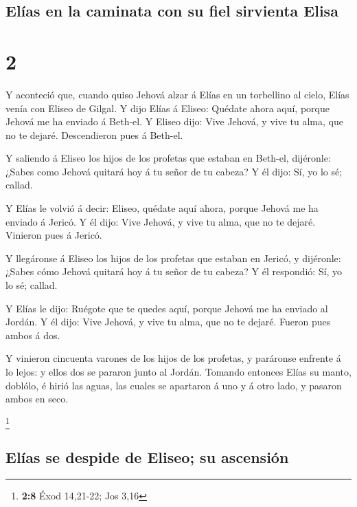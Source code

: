 \hypertarget{eluxedas-en-la-caminata-con-su-fiel-sirvienta-elisa}{%
\subsection{Elías en la caminata con su fiel sirvienta
Elisa}\label{eluxedas-en-la-caminata-con-su-fiel-sirvienta-elisa}}

\hypertarget{section-1}{%
\section{2}\label{section-1}}

 Y aconteció que, cuando quiso Jehová alzar á Elías en un
torbellino al cielo, Elías venía con Eliseo de Gilgal.  Y
dijo Elías á Eliseo: Quédate ahora aquí, porque Jehová me ha enviado á
Beth-el. Y Eliseo dijo: Vive Jehová, y vive tu alma, que no te dejaré.
Descendieron pues á Beth-el.

 Y saliendo á Eliseo los hijos de los profetas que estaban
en Beth-el, dijéronle: ¿Sabes como Jehová quitará hoy á tu señor de tu
cabeza? Y él dijo: Sí, yo lo sé; callad.

 Y Elías le volvió á decir: Eliseo, quédate aquí ahora,
porque Jehová me ha enviado á Jericó. Y él dijo: Vive Jehová, y vive tu
alma, que no te dejaré. Vinieron pues á Jericó.

 Y llegáronse á Eliseo los hijos de los profetas que estaban
en Jericó, y dijéronle: ¿Sabes cómo Jehová quitará hoy á tu señor de tu
cabeza? Y él respondió: Sí, yo lo sé; callad.

 Y Elías le dijo: Ruégote que te quedes aquí, porque Jehová
me ha enviado al Jordán. Y él dijo: Vive Jehová, y vive tu alma, que no
te dejaré. Fueron pues ambos á dos.

 Y vinieron cincuenta varones de los hijos de los profetas,
y paráronse enfrente á lo lejos: y ellos dos se pararon junto al Jordán.
 Tomando entonces Elías su manto, doblólo, é hirió las
aguas, las cuales se apartaron á uno y á otro lado, y pasaron ambos en
seco.

\footnote{\textbf{2:8} Éxod 14,21-22; Jos 3,16}

\hypertarget{eluxedas-se-despide-de-eliseo-su-ascensiuxf3n}{%
\subsection{Elías se despide de Eliseo; su
ascensión}\label{eluxedas-se-despide-de-eliseo-su-ascensiuxf3n}}

